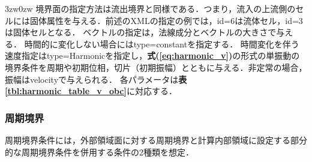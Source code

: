 \begin{indentation}{3zw}{0zw}
\noindent 境界面の指定方法は流出境界と同様である．つまり，流入の上流側のセルには固体属性を与える．前述のXMLの指定の例では，id=6は流体セル，id=3は固体セルとなる．
ベクトルの指定は，法線成分とベクトルの大きさで与える．
時間的に変化しない場合にはtype=constantを指定する．
時間変化を伴う速度指定はtype=Harmonicを指定し，\textbf{式(\ref{eq:harmonic_v})}の形式の単振動の境界条件を周期や初期位相，切片（初期振幅）とともに与える．非定常の場合，振幅はvelocityで与えられる．
各パラメータは\textbf{表\ref{tbl:harmonic_table_v_obc}}に対応する．

\end{indentation}


\pagebreak
%
\subsubsection{周期境界}
\label{sec:BC periodic}

周期境界条件には，外部領域面に対する周期境界と計算内部領域に設定する部分的な周期境界条件を併用する条件の2種類を想定．

